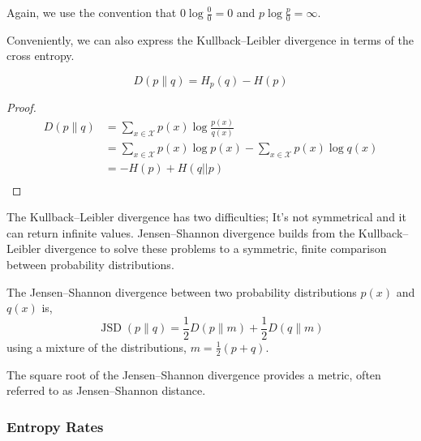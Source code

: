 Again, we use the convention that  $0 \log \frac{0}{0} = 0 $ and $p \log \frac{p}{0} = \infty $. 


Conveniently, we can also express the Kullback–Leibler divergence in terms of the cross entropy.
\begin{lemma}
		\begin{equation}
		D(p \| q) = H_p(q) - H(p) 
		\end{equation}
\end{lemma}
\begin{proof}
	\begin{align}
		D(p \| q) &=\sum_{x \in \mathcal{X}} p(x) \log \frac{p(x)}{q(x)} \\
		 &= \sum_{x \in \mathcal{X}} p(x) \log p(x)    -     \sum_{x \in \mathcal{X}} p(x) \log q(x)\\
		 &= -H(p)   +    H(q||p)\\
	\end{align}
\end{proof}

The Kullback–Leibler divergence has two difficulties; It's not symmetrical and it can return infinite values. Jensen–Shannon divergence builds from the Kullback–Leibler divergence to solve these problems to a symmetric, finite comparison between probability distributions. 

\begin{definition}
 The Jensen–Shannon divergence between two probability distributions $p(x)$ and $q(x)$ is,
	\begin{equation}
	\operatorname{JSD}(p \| q)=\frac{1}{2} D(p \| m)+\frac{1}{2} D(q \| m)
	\end{equation}
	using a mixture of the distributions, 	$m=\frac{1}{2}(p+q)$.
\end{definition}


\begin{remark}
	The square root of the Jensen–Shannon divergence provides a metric, often referred to as Jensen–Shannon distance.
\end{remark}







\subsubsection{Entropy Rates}\label{sec:entropyrate}

